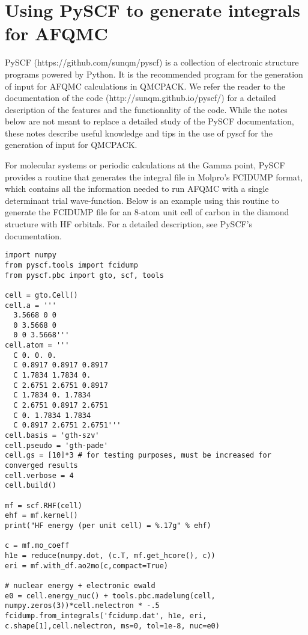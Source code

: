 \section{Using PySCF to generate integrals for AFQMC}
\label{sec:pyscf}

PySCF (https://github.com/sunqm/pyscf) is a collection of electronic structure programs powered by Python. It is the recommended program for the generation of input for AFQMC calculations in QMCPACK. We refer the reader to the documentation of the code (http://sunqm.github.io/pyscf/) for a detailed description of the features and the functionality of the code. While the notes below are not meant to replace a detailed study of the PySCF documentation, these notes describe useful knowledge and tips in the use of pyscf for the generation of input for QMCPACK. 

For molecular systems or periodic calculations at the Gamma point, PySCF provides a routine that generates the integral file in Molpro's FCIDUMP format, which contains all the information needed to run AFQMC with a single determinant trial wave-function. Below is an example using this routine to generate the FCIDUMP file for an 8-atom unit cell of carbon in the diamond structure with HF orbitals. For a detailed description, see PySCF's documentation.  
\begin{lstlisting}[style=Python,caption=Simple example showing how to generate FCIDUMP files with PySCF]
import numpy
from pyscf.tools import fcidump
from pyscf.pbc import gto, scf, tools

cell = gto.Cell()
cell.a = '''
  3.5668 0 0
  0 3.5668 0
  0 0 3.5668'''
cell.atom = '''
  C 0. 0. 0. 
  C 0.8917 0.8917 0.8917
  C 1.7834 1.7834 0. 
  C 2.6751 2.6751 0.8917
  C 1.7834 0. 1.7834
  C 2.6751 0.8917 2.6751
  C 0. 1.7834 1.7834
  C 0.8917 2.6751 2.6751'''
cell.basis = 'gth-szv'
cell.pseudo = 'gth-pade'
cell.gs = [10]*3 # for testing purposes, must be increased for converged results 
cell.verbose = 4
cell.build()

mf = scf.RHF(cell)
ehf = mf.kernel()
print("HF energy (per unit cell) = %.17g" % ehf) 

c = mf.mo_coeff
h1e = reduce(numpy.dot, (c.T, mf.get_hcore(), c))
eri = mf.with_df.ao2mo(c,compact=True)

# nuclear energy + electronic ewald 
e0 = cell.energy_nuc() + tools.pbc.madelung(cell, numpy.zeros(3))*cell.nelectron * -.5
fcidump.from_integrals('fcidump.dat', h1e, eri, c.shape[1],cell.nelectron, ms=0, tol=1e-8, nuc=e0)
\end{lstlisting}

